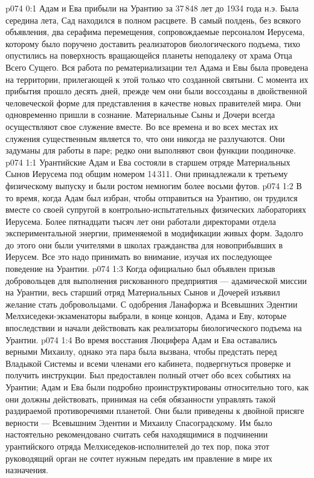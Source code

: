 \author{Солония}
\vs p074 0:1 Адам и Ева прибыли на Урантию за 37\,848 лет до 1934 года н.э. Была середина лета, Сад находился в полном расцвете. В самый полдень, без всякого объявления, два серафима перемещения, сопровождаемые персоналом Иерусема, которому было поручено доставить реализаторов биологического подъема, тихо опустились на поверхность вращающейся планеты неподалеку от храма Отца Всего Сущего. Вся работа по рематериализации тел Адама и Евы была проведена на территории, прилегающей к этой только что созданной святыни. С момента их прибытия прошло десять дней, прежде чем они были воссозданы в двойственной человеческой форме для представления в качестве новых правителей мира. Они одновременно пришли в сознание. Материальные Сыны и Дочери всегда осуществляют свое служение вместе. Во все времена и во всех местах их служения существенным является то, что они никогда не разлучаются. Они задуманы для работы в паре; редко они выполняют свои функции поодиночке.
\vs p074 1:1 Урантийские Адам и Ева состояли в старшем отряде Материальных Сынов Иерусема под общим номером 14\,311. Они принадлежали к третьему физическому выпуску и были ростом немногим более восьми футов.
\vs p074 1:2 В то время, когда Адам был избран, чтобы отправиться на Урантию, он трудился вместе со своей супругой в контрольно\hyp{}испытательных физических лабораториях Иерусема. Более пятнадцати тысяч лет они работали директорами отдела экспериментальной энергии, применяемой в модификации живых форм. Задолго до этого они были учителями в школах гражданства для новоприбывших в Иерусем. Все это надо принимать во внимание, изучая их последующее поведение на Урантии.
\vs p074 1:3 Когда официально был объявлен призыв добровольцев для выполнения рискованного предприятия --- адамической миссии на Урантии, весь старший отряд Материальных Сынов и Дочерей изъявил желание стать добровольцами. С одобрения Ланафоржа и Всевышних Эдентии Мелхиседеки\hyp{}экзаменаторы выбрали, в конце концов, Адама и Еву, которые впоследствии и начали действовать как реализаторы биологического подъема на Урантии.
\vs p074 1:4 Во время восстания Люцифера Адам и Ева оставались верными Михаилу, однако эта пара была вызвана, чтобы предстать перед Владыкой Системы и всеми членами его кабинета, подвергнуться проверке и получить инструкции. Был предоставлен полный отчет обо всех событиях на Урантии; Адам и Ева были подробно проинструктированы относительно того, как они должны действовать, принимая на себя обязанности управлять такой раздираемой противоречиями планетой. Они были приведены к двойной присяге верности --- Всевышним Эдентии и Михаилу Спасоградскому. Им было настоятельно рекомендовано считать себя находящимися в подчинении урантийского отряда Мелхиседеков\hyp{}исполнителей до тех пор, пока этот руководящий орган не сочтет нужным передать им правление в мире их назначения.
